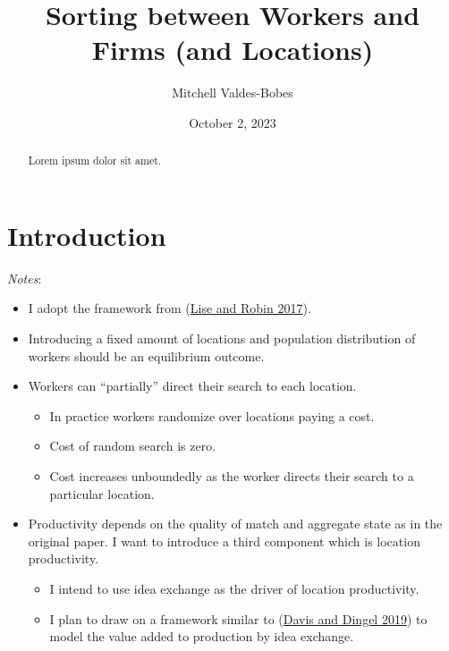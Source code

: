 \documentclass[
  letterpaper,
  DIV=11,
  numbers=noendperiod]{scrreprt}
\title{Sorting between Workers and Firms (and Locations)}
\author{Mitchell Valdes-Bobes}
\date{October 2, 2023}
\providecommand{\tightlist}{%
  \setlength{\itemsep}{0pt}\setlength{\parskip}{0pt}}\usepackage{longtable,booktabs,array}
\renewcommand*\contentsname{Table of contents}
\newcommand\contentsname{Table of contents}
\begin{document}
\maketitle
\begin{abstract}
Lorem ipsum dolor sit amet.
\end{abstract}
\ifdefined\Shaded\renewenvironment{Shaded}{\begin{tcolorbox}[boxrule=0pt, enhanced, interior hidden, frame hidden, sharp corners, breakable, borderline west={3pt}{0pt}{shadecolor}]}{\end{tcolorbox}}\fi

\renewcommand*\contentsname{Table of contents}
{
\hypersetup{linkcolor=}
\setcounter{tocdepth}{2}
\tableofcontents
}

\hypertarget{introduction}{%
\chapter{Introduction}\label{introduction}}

\emph{Notes}:

\begin{itemize}
\tightlist
\item
  I adopt the framework from
  (\protect\hyperlink{ref-liseMacrodynamicsSortingWorkers2017}{Lise and
  Robin 2017}).
\item
  Introducing a fixed amount of locations and population distribution of
  workers should be an equilibrium outcome.
\item
  Workers can ``partially'' direct their search to each location.

  \begin{itemize}
  \tightlist
  \item
    In practice workers randomize over locations paying a cost.
  \item
    Cost of random search is zero.
  \item
    Cost increases unboundedly as the worker directs their search to a
    particular location.
  \end{itemize}
\item
  Productivity depends on the quality of match and aggregate state as in
  the original paper. I want to introduce a third component which is
  location productivity.

  \begin{itemize}
  \tightlist
  \item
    I intend to use idea exchange as the driver of location
    productivity.
  \item
    I plan to draw on a framework similar to
    (\protect\hyperlink{ref-davisSpatialKnowledgeEconomy2019}{Davis and
    Dingel 2019}) to model the value added to production by idea
    exchange.
  \end{itemize}
\end{itemize}
\end{document}
